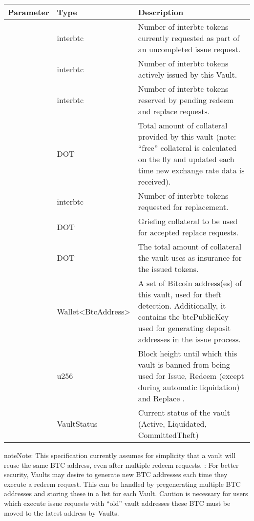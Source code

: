 \documentclass[a4paper,10pt,english]{sphinxmanual}
\begin{document}
\begin{savenotes}\sphinxattablestart
\centering
\begin{tabulary}{\linewidth}[t]{|l|l|L|}
\hline
\sphinxstyletheadfamily 
Parameter
&\sphinxstyletheadfamily 
Type
&\sphinxstyletheadfamily 
Description
\\
\hline
{}
&
interbtc
&
Number of interbtc tokens currently requested as part of an uncompleted issue request.
\\
\hline
{}
&
interbtc
&
Number of interbtc tokens actively issued by this Vault.
\\
\hline
{}
&
interbtc
&
Number of interbtc tokens reserved by pending redeem and replace requests.
\\
\hline
{}
&
DOT
&
Total amount of collateral provided by this vault (note: “free” collateral is calculated on the fly and updated each time new exchange rate data is received).
\\
\hline
{}
&
interbtc
&
Number of interbtc tokens requested for replacement.
\\
\hline
{}
&
DOT
&
Griefing collateral to be used for accepted replace requests.
\\
\hline
{}
&
DOT
&
The total amount of collateral the vault uses as insurance for the issued tokens.
\\
\hline
{}
&
Wallet\textless{}BtcAddress\textgreater{}
&
A set of Bitcoin address(es) of this vault, used for theft detection. Additionally, it contains the btcPublicKey used for generating deposit addresses in the issue process.
\\
\hline
{}
&
u256
&
Block height until which this vault is banned from being used for Issue, Redeem (except during automatic liquidation) and Replace .
\\
\hline
{}
&
VaultStatus
&
Current status of the vault (Active, Liquidated, CommittedTheft)
\\
\hline
\end{tabulary}
\par
\sphinxattableend\end{savenotes}

\begin{sphinxadmonition}{note}{Note:}
This specification currently assumes for simplicity that a vault will reuse the same BTC address, even after multiple redeem requests. : For better security, Vaults may desire to generate new BTC addresses each time they execute a redeem request. This can be handled by pre\sphinxhyphen{}generating multiple BTC addresses and storing these in a list for each Vault. Caution is necessary for users which execute issue requests with “old” vault addresses \sphinxhyphen{} these BTC must be moved to the latest address by Vaults.
\end{sphinxadmonition}
\end{document}

